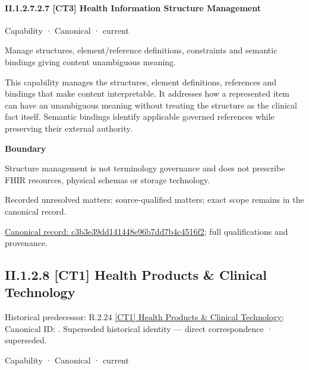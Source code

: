 \paragraph*{II.1.2.7.2.7 [CT3] Health Information Structure Management}
\label{navigation:II.1.2.7.2.7}

\label{element:c3b3e39dd141448e96b7dd7b4c4516f2}
{\small Capability · Canonical · current}\par

Manage structures, element/reference definitions, constraints and semantic bindings giving content unambiguous meaning.



This capability manages the structures, element definitions, references and bindings that make content interpretable. It addresses how a represented item can have an unambiguous meaning without treating the structure as the clinical fact itself. Semantic bindings identify applicable governed references while preserving their external authority.



\textbf{Boundary}



Structure management is not terminology governance and does not prescribe FHIR resources, physical schemas or storage technology.


{\small Recorded unresolved matters: source-qualified matters; exact scope remains in the canonical record.}\par
{\footnotesize \href{../../../../continuum/strategy/capability/c3b3e39dd141448e96b7dd7b4c4516f2.md}{Canonical record: c3b3e39dd141448e96b7dd7b4c4516f2}; full qualifications and provenance.}\par
\subsection*{II.1.2.8 [CT1] Health Products \& Clinical Technology}
\label{navigation:II.1.2.8}

{\small Historical predecessor: R.2.24 \hyperref[element:a631a8600b8b49df9ef452c48c91349a]{[CT1] Health Products \& Clinical Technology}; Canonical ID: \texttt{}. Superseded historical identity — direct correspondence · superseded.}\par
\label{element:54388e3202c2403089b5c476c78c4567}
{\small Capability · Canonical · current}\par

